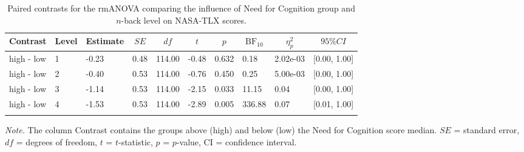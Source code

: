 \documentclass[
  man,floatsintext]{apa6}
\begin{document}
\begin{table}[H]

\begin{center}
\begin{threeparttable}

\caption{\label{tab:unnamed-chunk-13}Paired contrasts for the rmANOVA comparing the influence of Need for Cognition group and $n$-back level on NASA-TLX scores.}

\begin{tabular}{llllllllll}
\toprule
Contrast & \multicolumn{1}{c}{Level} & \multicolumn{1}{c}{Estimate} & \multicolumn{1}{c}{$SE$} & \multicolumn{1}{c}{$df$} & \multicolumn{1}{c}{$t$} & \multicolumn{1}{c}{$p$} & \multicolumn{1}{c}{$\mathrm{BF}_{\textrm{10}}$} & \multicolumn{1}{c}{$\eta_{p}^{2}$} & \multicolumn{1}{c}{$95\% CI$}\\
\midrule
high - low & 1 & -0.23 & 0.48 & 114.00 & -0.48 & 0.632 & 0.18 & 2.02e-03 & {}[0.00, 1.00]\\
high - low & 2 & -0.40 & 0.53 & 114.00 & -0.76 & 0.450 & 0.25 & 5.00e-03 & {}[0.00, 1.00]\\
high - low & 3 & -1.14 & 0.53 & 114.00 & -2.15 & 0.033 & 11.15 & 0.04 & {}[0.00, 1.00]\\
high - low & 4 & -1.53 & 0.53 & 114.00 & -2.89 & 0.005 & 336.88 & 0.07 & {}[0.01, 1.00]\\
\bottomrule
\addlinespace
\end{tabular}

\begin{tablenotes}[para]
\normalsize{\textit{Note.} The column Contrast contains the groups above (high) and below (low) the Need for Cognition score median. $SE$ = standard error, $df$ = degrees of freedom, $t$ = $t$-statistic, $p$ = $p$-value, CI = confidence interval.}
\end{tablenotes}

\end{threeparttable}
\end{center}

\end{table}

\newpage
\end{document}
